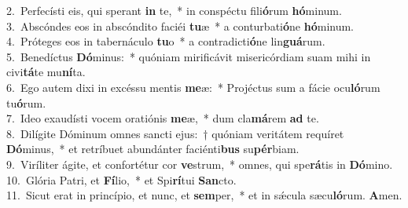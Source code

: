 {2.~}Perfecísti eis, qui sperant \textbf{in} te,~* in conspéctu fili\textbf{ó}rum \textbf{hó}minum.\\
{3.~}Abscóndes eos in abscóndito faciéi \textbf{tu}æ~* a conturbati\textbf{ó}ne \textbf{hó}minum.\\
{4.~}Próteges eos in tabernáculo \textbf{tu}o~* a contradicti\textbf{ó}ne lin\textbf{guá}rum.\\
{5.~}Benedíctus \textbf{Dó}minus:~* quóniam mirificávit misericórdiam suam mihi in civi\textbf{tá}te mu\textbf{ní}ta.\\
{6.~}Ego autem dixi in excéssu mentis \textbf{me}æ:~* Projéctus sum a fácie ocu\textbf{ló}rum tu\textbf{ó}rum.\\
{7.~}Ideo exaudísti vocem oratiónis \textbf{me}æ,~* dum cla\textbf{má}rem \textbf{ad} te.\\
{8.~}Dilígite Dóminum omnes sancti ejus:~† quóniam veritátem requíret \textbf{Dó}minus,~* et retríbuet abundánter faciénti\textbf{bus} su\textbf{pér}biam.\\
{9.~}Viríliter ágite, et confortétur cor \textbf{ve}strum,~* omnes, qui spe\textbf{rá}tis in \textbf{Dó}mino.\\
{10.~}Glória Patri, et \textbf{Fí}lio,~* et Spi\textbf{rí}tui \textbf{San}cto.\\
{11.~}Sicut erat in princípio, et nunc, et \textbf{sem}per,~* et in sǽcula sæcu\textbf{ló}rum. \textbf{A}men.\\
